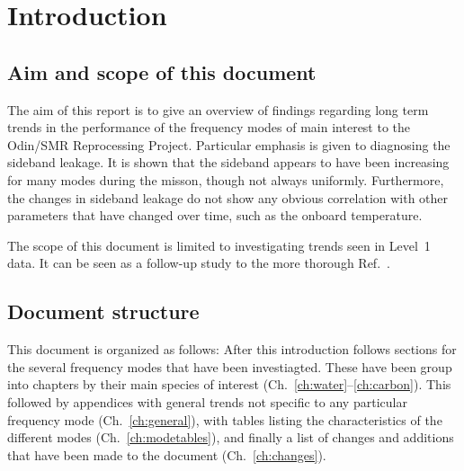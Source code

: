 \chapter{Introduction}
\label{ch:introduction}


\setcounter{page}{1}


\section{Aim and scope of this document}
\label{sec:aim}
The aim of this report is to give an overview of findings regarding long term
trends in the performance of the frequency modes of main interest to the
Odin/SMR Reprocessing Project.  Particular emphasis is given to diagnosing the
sideband leakage.  It is shown that the sideband appears to have been
increasing for many modes during the misson, though not always uniformly.
Furthermore, the changes in sideband leakage do not show any obvious
correlation with other parameters that have changed over time, such as the
onboard temperature.

The scope of this document is limited to investigating trends seen in Level~1
data. It can be seen as a follow-up study to the more thorough
Ref.~\cite{postlaunch:2006}.

\section{Document structure}
\label{sec:structure}
This document is organized as follows:  After this introduction follows
sections for the several frequency modes that have been investiagted.  These
have been group into chapters by their main species of interest
(Ch.~\ref{ch:water}--\ref{ch:carbon}).  This followed by appendices with general
trends not specific to any particular frequency mode (Ch.~\ref{ch:general}),
with tables listing the characteristics of the different modes
(Ch.~\ref{ch:modetables}), and finally a list of changes and additions that
have been made to the document (Ch.~\ref{ch:changes}).
